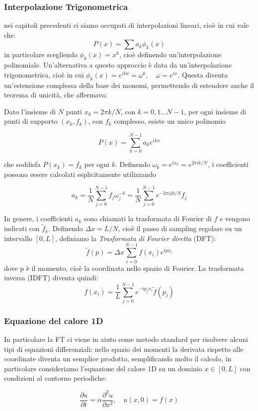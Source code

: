\documentclass[11pt, a4paper]{article}
\begin{document}
\subsubsection{Interpolazione Trigonometrica}
nei capitoli precedenti ci siamo occupati di interpolazioni lineari, cioè in cui vale che:
\[
P(x) = \sum a_k \phi_k(x)
\]
in particolare scegliendo $\phi_k(x) = x^k$, cioè definendo un'interpolazione polinomiale. Un'alternativa a questo approccio è data da un'interpolazione trigonometrica, cioè in cui $\phi_k(x) = e^{ikx} = \omega^k, \quad \omega = e^{ix}$. Questa diventa un'estensione complessa della base dei monomi, permettendo di estendere anche il teorema di unicità, che affermava:

\bigskip
\noindent Dato l'insieme di $N$ punti $x_k = 2\pi k/N$, con $k = 0, 1 \dots N - 1$, per ogni insieme di punti di supporto $(x_k, f_k)$, con $f_k$ complesso, esiste un unico polinomio

\[
P(x) = \sum_{k=0}^{N-1} a_k e^{ikx}
\]

\noindent che soddisfa $P(x_k) = f_k$ per ogni $k$. Definendo $\omega_k = e^{ix_k} = e^{2\pi i k/N}$, i coefficienti possono essere calcolati esplicitamente utilizzando

\[
a_k = \frac{1}{N} \sum_{j=0}^{N-1} f_j \omega_j^{-k} = \frac{1}{N} \sum_{j=0}^{N-1} e^{-2\pi ijk/N} f_j
\]

\noindent In genere, i coefficienti $a_k$ sono chiamati la trasformata di Fourier di $f$ e vengono indicati con $\tilde{f}_k$.
Definendo $\Delta x = L/N$, cioè il passo di sampling regolare su un intervallo $[0, L]$, definiamo la \textit{Trasformata di Fourier diretta} (DFT):
\[
\tilde{f}(p) = \Delta x \sum_{i=0}^{N-1} f(x_i) e^{ipx_i}
\]
dove p è il momento, cioè la coordinata nello spazio di Fourier. La trasformata inversa (IDFT) diventa quindi:
\[
f(x_i) = \frac{1}{L} \sum_{j=0}^{N-1} e^{-ip_j x_i} \tilde{f}(p_j)
\]

\subsubsection{Equazione del calore 1D}
In particolare la FT ci viene in aiuto come metodo standard per risolvere alcuni tipi di equazioni differenziali: nello spazio dei momenti la derivata rispetto alle coordinate diventa un semplice prodotto, semplificando molto il calcolo, in particolare consideriamo l'equazione del calore 1D su un dominio $x \in [0, L]$ con condizioni al contorno periodiche:

\begin{equation} \label{eq: Heat eq}
\frac{\partial u}{\partial t} = \alpha \frac{\partial^2 u}{\partial x^2}, \quad u(x, 0) = f(x)
\end{equation}
\end{document}
